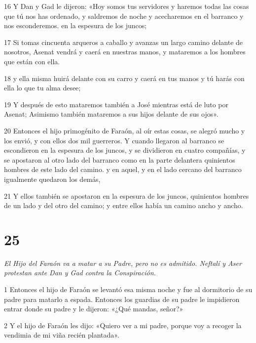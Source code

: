 \par 16 Y Dan y Gad le dijeron: «Hoy somos tus servidores y haremos todas las cosas que tú nos has ordenado, y saldremos de noche y acecharemos en el barranco y nos esconderemos. en la espesura de los juncos;

\par 17 Si tomas cincuenta arqueros a caballo y avanzas un largo camino delante de nosotros, Asenat vendrá y caerá en nuestras manos, y mataremos a los hombres que están con ella.

\par 18 y ella misma huirá delante con su carro y caerá en tus manos y tú harás con ella lo que tu alma desee;

\par 19 Y después de esto mataremos también a José mientras está de luto por Asenat; Asimismo también mataremos a sus hijos delante de sus ojos».

\par 20 Entonces el hijo primogénito de Faraón, al oír estas cosas, se alegró mucho y los envió, y con ellos dos mil guerreros. Y cuando llegaron al barranco se escondieron en la espesura de los juncos, y se dividieron en cuatro compañías, y se apostaron al otro lado del barranco como en la parte delantera quinientos hombres de este lado del camino. y en aquel, y en el lado cercano del barranco igualmente quedaron los demás,

\par 21 Y ellos también se apostaron en la espesura de los juncos, quinientos hombres de un lado y del otro del camino; y entre ellos había un camino ancho y ancho.


\chapter{25}

\par \textit{El Hijo del Faraón va a matar a su Padre, pero no es admitido. Neftalí y Aser protestan ante Dan y Gad contra la Conspiración.}


\par 1 Entonces el hijo de Faraón se levantó esa misma noche y fue al dormitorio de su padre para matarlo a espada. Entonces los guardias de su padre le impidieron entrar donde su padre y le dijeron: «¿Qué mandas, señor?»

\par 2 Y el hijo de Faraón les dijo: «Quiero ver a mi padre, porque voy a recoger la vendimia de mi viña recién plantada».

